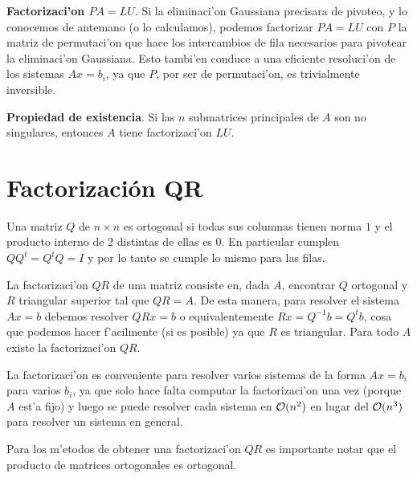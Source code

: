 \documentclass[a4paper,spanish]{article}
\newcommand{\Ode}[0]{{\cal O}}
\begin{document}
\textbf{Factorizaci'on $PA=LU$}. Si la eliminaci'on Gaussiana precisara de
pivoteo, y lo conocemos de antemano (o lo calculamos), podemos factorizar
$PA=LU$ con $P$ la matriz de permutaci'on que hace los intercambios de fila
necesarios para pivotear la eliminaci'on Gaussiana. Esto tambi'en conduce a
una eficiente resoluci'on de los sistemas $Ax= b_i$, ya que $P$, por ser de
permutaci'on, es trivialmente inversible.

\textbf{Propiedad de existencia}. Si las $n$ submatrices principales de $A$
son no singulares, entonces $A$ tiene factorizaci'on $LU$.

\section{Factorizaci\'on QR}

Una matriz $Q$ de $n \times n$ es ortogonal si todas sus columnas tienen
norma $1$ y el producto interno de 2 distintas de ellas es $0$. En particular
cumplen $QQ^t = Q^tQ = I$ y por lo tanto se cumple lo mismo para las filas.

La factorizaci'on $QR$ de una matriz consiste en, dada $A$, encontrar $Q$
ortogonal y $R$ triangular superior tal que $QR = A$. De esta manera, para
resolver el sistema $Ax = b$ debemos resolver $QRx = b$ o equivalentemente
$Rx = Q^{-1}b = Q^t b$, cosa que podemos hacer f'acilmente (si es posible) 
ya que $R$ es triangular. Para todo $A$ existe la factorizaci'on $QR$.

La factorizaci'on es conveniente para resolver varios sistemas de la forma
$Ax = b_i$ para varios $b_i$, ya que solo hace falta computar la factorizaci'on
una vez (porque $A$ est'a fijo) y luego se puede resolver cada sistema en 
$\Ode(n^2)$ en lugar del $\Ode(n^3)$ para resolver un sistema en general.

Para los m'etodos de obtener una factorizaci'on $QR$ es importante notar que
el producto de matrices ortogonales es ortogonal.
\end{document}
